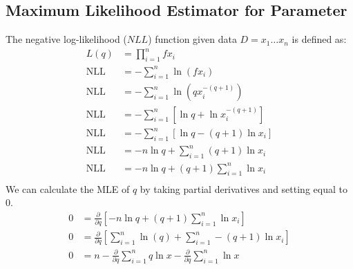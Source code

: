 \subsection{Maximum Likelihood Estimator for Parameter}
 The negative log-likelihood ($NLL$) function given data $D = x_1 \ldots x_n$ is defined as:
 \begin{align*}
 L(q) &= \prod_{i=1}^{n} f{x_i}\\
 \text{NLL} &= -\sum_{i=1}^{n} \ln(f{x_i}) \\
 \text{NLL} &= -\sum_{i=1}^{n}\ln(qx_i^{-(q+1)})\\
 \text{NLL} &= -\sum_{i=1}^{n}\left[\ln{q} + \ln{x_i^{-(q+1)}}\right]\\
 \text{NLL} &= -\sum_{i=1}^{n}\left[\ln{q} - (q+1)\ln{x_i}\right]\\
 \text{NLL} &= -n\ln{q} + \sum_{i=1}^{n}(q+1)\ln{x_i}\\
 \text{NLL} &= -n\ln{q} + (q+1)\sum_{i=1}^{n}\ln{x_i}\\
  \end{align*}
 We can calculate the MLE of $q$ by taking partial derivatives and setting equal to $0$.
  \begin{align*}
 0 &= \frac{\partial}{\partial q}\left[ 
 -n\ln{q} + 
 (q+1)\sum_{i=1}^{n}\ln{x_i}
 \right] \\
 0 &= \frac{\partial}{\partial q}\left[ \sum_{i=1}^{n}\ln(q) + \sum_{i=1}^{n} -(q+1)\ln{x_i}\right] \\
 0 &= n - \frac{\partial}{\partial q}\sum_{i=1}^{n} q\ln{x} - \frac{\partial}{\partial q} \sum_{i=1}^{n} \ln{x} 
 \end{align*}